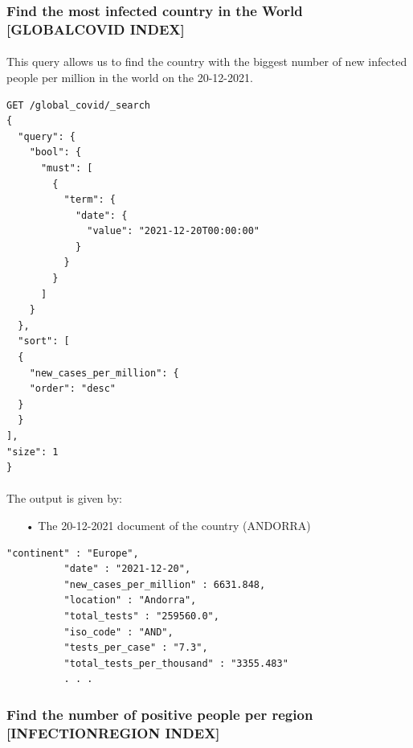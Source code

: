 \documentclass[a4paper,12pt]{article}
\begin{document}
\subsubsection{Find the most infected country in the World [GLOBAL\textunderscore COVID INDEX]  }
\paragraph{} This query allows us to find the country with the biggest number of new infected people per million in the world on the 20-12-2021.
\begin{tcolorbox}[colback=green!5!white,colframe=green!75!black,title=QUERY]
\begin{verbatim}
GET /global_covid/_search
{ 
  "query": {
    "bool": {
      "must": [
        {
          "term": {
            "date": {
              "value": "2021-12-20T00:00:00"
            }
          }
        }
      ]
    }
  }, 
  "sort": [
  {
    "new_cases_per_million": {
    "order": "desc"
  }
  }
],
"size": 1
}
\end{verbatim}
\end{tcolorbox}
\newpage

\paragraph{} The output is given by: 
\begin{itemize}[noitemsep]
\item[•] The 20-12-2021 document of the country (ANDORRA)
\end{itemize}

\begin{tcolorbox}[colback=red!5!white,colframe=red!75!black,title=OUTPUT]
\begin{verbatim}
"continent" : "Europe",
          "date" : "2021-12-20",
          "new_cases_per_million" : 6631.848,
          "location" : "Andorra",
          "total_tests" : "259560.0",
          "iso_code" : "AND",
          "tests_per_case" : "7.3",
          "total_tests_per_thousand" : "3355.483"
          . . .
\end{verbatim}
\end{tcolorbox}
\newpage

\subsubsection{Find the number of positive people per region [INFECTION\textunderscore REGION INDEX]  }
\end{document}
